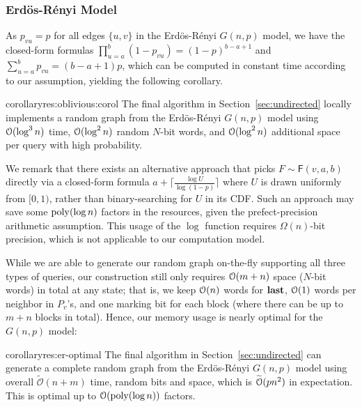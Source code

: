 \subsubsection{Erd\"{o}s-R\'{e}nyi Model}
\label{sec:app_er}
As $p_{vu} = p$ for all edges $\{u,v\}$ in the Erd\"{o}s-R\'{e}nyi $G(n,p)$ model, we have the closed-form formulas $\prod_{u=a}^b (1-p_{vu}) = (1-p)^{b-a+1}$ and $\sum_{u=a}^b p_{vu} = (b-a+1)p$, which can be computed in constant time according to our assumption, yielding the following corollary.
\begin{restatable}{corollary}{res:oblivious:corol}
The final algorithm in Section~\ref{sec:undirected} locally implements a random graph from the Erd\"{o}s-R\'{e}nyi $G(n,p)$ model using $\mathcal{O}(\log^3 n)$ time, $\mathcal{O}(\log^2 n)$ random $N$-bit words, and $\mathcal{O}(\log^2 n)$ additional space per query with high probability.
\end{restatable}

We remark that there exists an alternative approach that picks $F\sim\mathsf{F}(v,a,b)$ directly via a closed-form formula $a+\lceil\frac{\log U}{\log (1-p)}\rceil$ where $U$ is drawn uniformly from $[0,1)$, rather than binary-searching for $U$ in its CDF. Such an approach may save some $\mathrm{poly}(\log n)$ factors in the resources, given the prefect-precision arithmetic assumption. This usage of the $\log$ function requires $\Omega(n)$-bit precision, which is not applicable to our computation model.

While we are able to generate our random graph on-the-fly supporting all three types of queries, our construction still only requires $\mathcal{O}(m+n)$ space ($N$-bit words) in total at any state; that is, we keep $\mathcal{O}(n)$ words for $\mathbf{last}$, $\mathcal{O}(1)$ words per neighbor in $P_v$'s, and one marking bit for each block (where there can be up to $m+n$ blocks in total). Hence, our memory usage is nearly optimal for the $G(n,p)$ model:

\begin{restatable}{corollary}{res:er-optimal}
\label{thm:er-optimal}
The final algorithm in Section~\ref{sec:undirected} can generate a complete random graph
from the Erd\"{o}s-R\'{e}nyi $G(n,p)$ model using overall
$\widetilde{\mathcal{O}}(n+m)$ time, random bits and space, which is $\widetilde{\mathcal{O}}(pn^2)$ in expectation.
This is optimal up to $ \mathcal{O}(\mathrm{poly}(\log n))$ factors.
\end{restatable}

\iffalse
The deterministic version (Section~\ref{sec:ER-det}) does not require the extra overhead resulting from failed iterations.
However, the two level data-structure introduces an extra $\Bo(\log n)$ factor, resulting in the same overall running time.
However, this only requires one $N$-bit random word.
\fi





